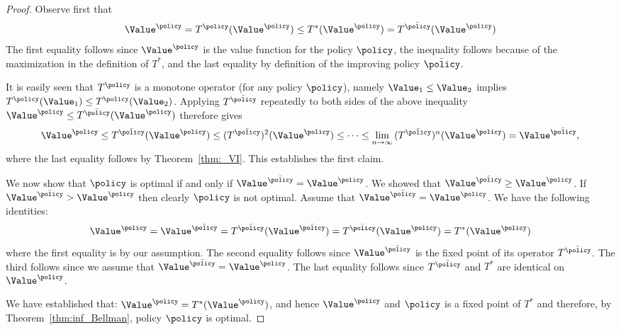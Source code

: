 \begin{proof} Observe first that
\[{\Value^\policy } = T_{}^\policy ({\Value^\policy }) \le T_{}^*({\Value^\policy }) = T_{}^{\bar \policy }({\Value^\policy })\]
The first equality follows since ${\Value^\policy }$ is the value
function for the policy $\policy $, the inequality follows because
of the maximization in the definition of  $T_{}^*$, and the last
equality by definition of the improving policy $\bar \policy $.

It is easily seen that $T_{}^\policy $ is a monotone operator (for
any policy $\policy $), namely ${\Value_1} \le {\Value_2}$ implies
$T_{}^\policy (\Value_1) \le T_{}^\policy (\Value_2)$. Applying
$T^{\bar \policy }$ repeatedly to both sides of the above inequality
${\Value^\policy } \le T_{}^{\bar \policy }(\Value^\policy)$
therefore gives
\begin{equation}\label{eq:PI_monotonicity_proof}
  {\Value^\policy } \le T_{}^{\bar \policy }({\Value^\policy }) \le {(T_{}^{\bar \policy })^2}({\Value^\policy }) \le  \cdots  \le \mathop {\lim }\limits_{n \to \infty } {(T_{}^{\bar \policy })^n}({\Value^\policy }) = {\Value^{\bar \policy }},  
\end{equation}
where the last equality follows by Theorem~\ref{thm:_VI}.
This establishes the first claim.

We now show that $\policy$ is optimal if and only if ${\Value^{\bar
\policy }} ={\Value^\policy }$. We showed that ${\Value^{\bar
\policy }} \ge {\Value^\policy }$. If ${\Value^{\bar \policy }} >
{\Value^\policy }$ then clearly $\policy$ is not optimal. Assume
that ${\Value^{\bar \policy }} = {\Value^\policy }$. We have the
following identities:
\[
\Value^{ \policy }= \Value^{\bar \policy } = T^{\bar \policy}(\Value^{\bar \policy })=T^{\bar \policy }(\Value^{\policy})
=T^*(\Value^{ \policy })
\]
where the first equality is by our assumption. The second equality
follows since $\Value^{\bar \policy } $ is the fixed point of its
operator $T^{\bar \policy }$. The third follows since we assume that
${\Value^{\bar \policy }} = {\Value^\policy }$. The last equality
follows since $T^{\bar \policy }$ and $T^{* }$ are identical on
${\Value^\policy }$.

We have established that: $\Value^{ \policy } =T^*(\Value^{ \policy
})$, and hence $\Value^{ \policy }$ and $\policy$ is a fixed point
of $T^*$ and therefore, by Theorem~\ref{thm:inf_Bellman}, policy
$\policy $ is optimal.
\end{proof}

